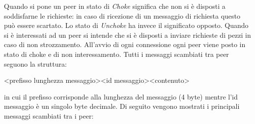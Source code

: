 \documentclass[a4]{book}
\begin{document}
Quando si pone un peer in stato di \textit{Choke} significa che non si è disposti a soddisfarne le richieste: in caso di ricezione di un messaggio di richiesta questo può essere scartato. Lo stato di \textit{Unchoke} ha invece il significato opposto.\newline
Quando si è interessati ad un peer si intende che si è disposti a inviare richieste di pezzi in caso di non strozzamento.\newline
All'avvio di ogni connessione ogni peer viene posto in stato di choke e di non interessamento.\newline\newline
Tutti i messaggi scambiati tra peer seguono la struttura: \begin{center}<prefisso lunghezza messaggio><id messaggio><contenuto>\end{center} in cui il prefisso corrisponde alla lunghezza del messaggio (4 byte) mentre l'id messaggio è un singolo byte decimale.\newline\newline
Di seguito vengono mostrati i principali messaggi scambiati tra i peer:
\end{document}
